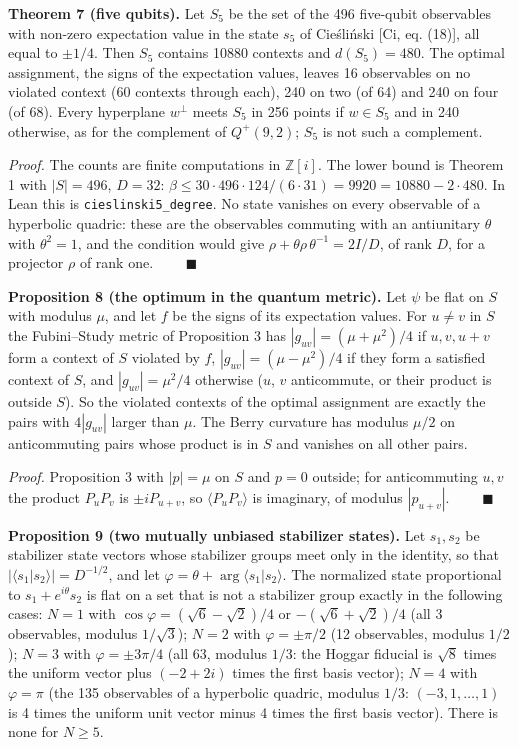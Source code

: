 \documentclass[11pt,a4paper]{article}
\begin{document}
\textbf{Theorem 7 (five qubits).} Let \(S_5\) be the set of the 496 five-qubit observables with non-zero
expectation value in the state \(s_5\) of Cieśliński {[}Ci, eq. (18){]}, all equal to \(\pm 1/4\). Then
\(S_5\) contains 10880 contexts and \(d(S_5) = 480\). The optimal assignment, the signs of the expectation
values, leaves 16 observables on no violated context (60 contexts through
each), 240 on two (of 64) and 240 on four (of 68). Every hyperplane \(w^\perp\) meets \(S_5\) in 256 points
if \(w \in S_5\) and in 240 otherwise, as for the complement of \(Q^+(9,2)\); \(S_5\) is not such a complement.

\emph{Proof.} The counts are finite computations in \(\mathbb{Z}[i]\). The lower bound is Theorem 1 with
\(|S| = 496\), \(D = 32\): \(\beta \le 30 \cdot 496 \cdot 124/(6 \cdot 31) = 9920 = 10880 - 2\cdot 480\). In Lean
this is \texttt{cieslinski5\_degree}. No state vanishes on every observable of a hyperbolic quadric: these are the
observables commuting with an antiunitary \(\theta\) with \(\theta^2 = 1\), and the condition would give
\(\rho + \theta\rho\,\theta^{-1} = 2I/D\), of rank \(D\), for a projector \(\rho\) of rank one. \(\qquad\blacksquare\)

\textbf{Proposition 8 (the optimum in the quantum metric).} Let \(\psi\) be flat on \(S\) with modulus \(\mu\), and
let \(f\) be the signs of its expectation values. For \(u \ne v\) in \(S\) the Fubini--Study metric of
Proposition 3 has \(|g_{uv}| = (\mu + \mu^2)/4\) if \(u, v, u+v\) form a context of \(S\) violated by \(f\),
\(|g_{uv}| = (\mu - \mu^2)/4\) if they form a satisfied context of \(S\), and \(|g_{uv}| = \mu^2/4\) otherwise
(\(u\), \(v\) anticommute, or their product is outside \(S\)). So the violated contexts of the optimal
assignment are exactly the pairs with \(4|g_{uv}|\) larger than \(\mu\). The Berry curvature has modulus
\(\mu/2\) on anticommuting pairs whose product is in \(S\) and vanishes on all other pairs.

\emph{Proof.} Proposition 3 with \(|p| = \mu\) on \(S\) and \(p = 0\) outside; for anticommuting \(u, v\) the product
\(P_uP_v\) is \(\pm i P_{u+v}\), so \(\langle P_uP_v\rangle\) is imaginary, of modulus \(|p_{u+v}|\).
\(\qquad\blacksquare\)

\textbf{Proposition 9 (two mutually unbiased stabilizer states).} Let \(s_1, s_2\) be stabilizer state vectors
whose stabilizer groups meet only in the identity, so that \(|\langle s_1|s_2\rangle| = D^{-1/2}\),
and let \(\varphi = \theta + \arg\langle s_1|s_2\rangle\). The normalized state proportional to
\(s_1 + e^{i\theta}s_2\) is flat on a set that is not a stabilizer group exactly in the following cases:
\(N = 1\) with \(\cos\varphi = (\sqrt6 - \sqrt2)/4\) or \(-(\sqrt6 + \sqrt2)/4\) (all 3 observables, modulus
\(1/\sqrt3\)); \(N = 2\) with \(\varphi = \pm\pi/2\) (12 observables, modulus \(1/2\)); \(N = 3\) with
\(\varphi = \pm 3\pi/4\) (all 63, modulus \(1/3\): the Hoggar fiducial is \(\sqrt8\) times the uniform vector
plus \((-2+2i)\) times the first basis vector); \(N = 4\) with \(\varphi = \pi\) (the 135 observables of a
hyperbolic quadric, modulus \(1/3\): \((-3,1,\dots,1)\) is 4 times the uniform unit vector minus 4 times the
first basis vector). There is none for \(N \ge 5\).
\end{document}
